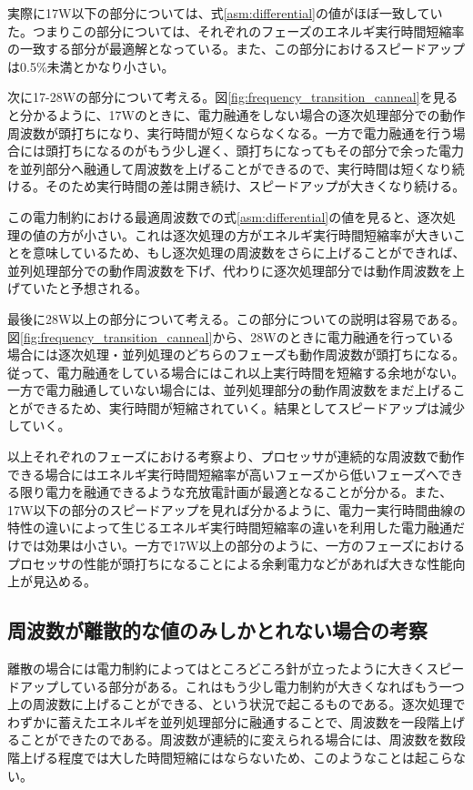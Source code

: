 実際に17W以下の部分については、式\ref{asm:differential}の値がほぼ一致していた。つまりこの部分については、それぞれのフェーズのエネルギ実行時間短縮率の一致する部分が最適解となっている。また、この部分におけるスピードアップは0.5\%未満とかなり小さい。

次に17-28Wの部分について考える。図\ref{fig:frequency_transition_canneal}を見ると分かるように、17Wのときに、電力融通をしない場合の逐次処理部分での動作周波数が頭打ちになり、実行時間が短くならなくなる。一方で電力融通を行う場合には頭打ちになるのがもう少し遅く、頭打ちになってもその部分で余った電力を並列部分へ融通して周波数を上げることができるので、実行時間は短くなり続ける。そのため実行時間の差は開き続け、スピードアップが大きくなり続ける。

この電力制約における最適周波数での式\ref{asm:differential}の値を見ると、逐次処理の値の方が小さい。これは逐次処理の方がエネルギ実行時間短縮率が大きいことを意味しているため、もし逐次処理の周波数をさらに上げることができれば、並列処理部分での動作周波数を下げ、代わりに逐次処理部分では動作周波数を上げていたと予想される。

最後に28W以上の部分について考える。この部分についての説明は容易である。図\ref{fig:frequency_transition_canneal}から、28Wのときに電力融通を行っている場合には逐次処理・並列処理のどちらのフェーズも動作周波数が頭打ちになる。従って、電力融通をしている場合にはこれ以上実行時間を短縮する余地がない。一方で電力融通していない場合には、並列処理部分の動作周波数をまだ上げることができるため、実行時間が短縮されていく。結果としてスピードアップは減少していく。

以上それぞれのフェーズにおける考察より、プロセッサが連続的な周波数で動作できる場合にはエネルギ実行時間短縮率が高いフェーズから低いフェーズへできる限り電力を融通できるような充放電計画が最適となることが分かる。また、17W以下の部分のスピードアップを見れば分かるように、電力ー実行時間曲線の特性の違いによって生じるエネルギ実行時間短縮率の違いを利用した電力融通だけでは効果は小さい。一方で17W以上の部分のように、一方のフェーズにおけるプロセッサの性能が頭打ちになることによる余剰電力などがあれば大きな性能向上が見込める。


\subsection{周波数が離散的な値のみしかとれない場合の考察}
\label{subsec:discreet}

離散の場合には電力制約によってはところどころ針が立ったように大きくスピードアップしている部分がある。これはもう少し電力制約が大きくなればもう一つ上の周波数に上げることができる、という状況で起こるものである。逐次処理でわずかに蓄えたエネルギを並列処理部分に融通することで、周波数を一段階上げることができたのである。周波数が連続的に変えられる場合には、周波数を数段階上げる程度では大した時間短縮にはならないため、このようなことは起こらない。


